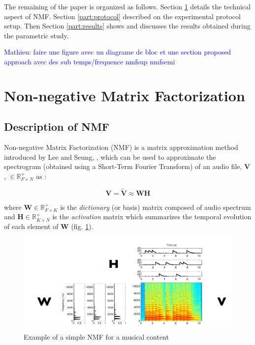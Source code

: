 \documentclass[twocolumn,a4paper,10pt]{article}
\newcommand{\ml}[1]{\textcolor{blue}{ Mathieu: #1}}
\begin{document}
The remaining of the paper is organized as follows. Section \ref{part:nmf} details the technical aspect of NMF. Section \ref{part:protocol} described on the experimental protocol setup. Then Section \ref{part:results} shows and discusses the results obtained during the parametric study.

\ml{faire une figure avec un diagrame de bloc et une section proposed approach avec des sub temps/frequence nmfsup nmfsemi}

\section{Non-negative Matrix Factorization}\label{part:nmf}
\subsection{Description of NMF}
Non-negative Matrix Factorization (NMF) is a matrix approximation method introduced by Lee and Seung, \cite{lee_learning_1999}, which can be used to approximate the spectrogram (obtained using a Short-Term Fourier Transform) of an audio file, $\mathbf{V}$, $\in \mathbb{R}^+_{F \times N}$ as :

\begin{equation}\label{eq:nmf}
\mathbf{V} = \mathbf{\tilde{V}} \approx \mathbf{WH}
\end{equation}

where $\mathbf{W} \in \mathbb{R}^+_{F \times K}$ is the \textit{dictionary} (or basis) matrix composed of audio spectrum and $\mathbf{H} \in \mathbb{R}^+_{K \times N}$ is the \textit{activation} matrix which summarizes the temporal evolution of each element of $\mathbf{W}$ (fig.  \ref{fig:example_NMF}).

\begin{figure}[hbtp]
\centering
\includegraphics[width=0.9\linewidth]{../image/illustration_NMF.PNG}
\caption{Example of a simple NMF  for a musical content \cite{bertin_les_2009}}
\label{fig:example_NMF}
\end{figure}
\end{document}
